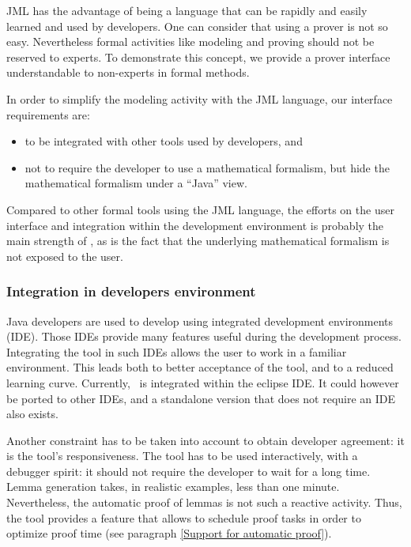 \label{Industrialisation}
JML has the advantage of being a language that can be rapidly and
easily learned and used by developers. One can consider that using a
prover is not so easy. Nevertheless formal activities like modeling
and proving should not be reserved to experts. To demonstrate this
concept, we provide a prover interface understandable to non-experts
in formal methods.

In order to simplify the modeling activity with the JML language, our
interface requirements are:
\begin{itemize}
 \item to be integrated with other tools used by developers, and
 \item not to require the developer to use a mathematical formalism,
    but hide the mathematical formalism under a ``Java'' view.
\end{itemize}
Compared to other formal tools using the JML language, the efforts on
the user interface and integration within the development
environment is probably the main strength of \JACK, as is the fact
that the underlying mathematical formalism is not exposed to the
user.
\subsubsection{Integration in developers environment}
 Java developers are used to develop using integrated development
 environments (IDE).  Those IDEs provide many features useful during
 the development process.  Integrating the tool in such IDEs allows
 the user to work in a familiar environment.  This leads both to
 better acceptance of the tool, and to a reduced learning curve.
 Currently, \JACK\ is integrated within the eclipse IDE.  It could
 however be ported to other IDEs, and a standalone version that does
 not require an IDE also exists.

 Another constraint has to be taken into account to obtain developer
 agreement: it is the tool's responsiveness.  The tool has to be used
 interactively, with a debugger spirit: it should not require the
 developer to wait for a long time.  Lemma generation takes, in
 realistic examples, less
 than one minute. %
 Nevertheless, the automatic proof of lemmas is not such a reactive
 activity. Thus, the tool provides a feature that allows to schedule
 proof tasks in order to optimize proof time (see paragraph
 \ref{Support for automatic proof}).


